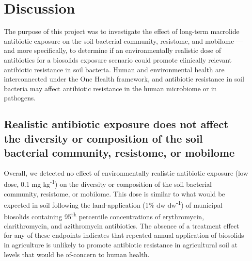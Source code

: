 \chapter{Discussion}

The purpose of this project was to investigate the effect of long-term macrolide antibiotic exposure on the soil bacterial community, resistome, and mobilome --- and more specifically, to determine if an environmentally realistic dose of antibiotics for a biosolids exposure scenario could promote clinically relevant antibiotic resistance in soil bacteria.
Human and environmental health are interconnected under the One Health framework, and antibiotic resistance in soil bacteria may affect antibiotic resistance in the human microbiome or in pathogens.


\section{Realistic antibiotic exposure does not affect the diversity or composition of the soil bacterial community, resistome, or mobilome}


Overall, we detected no effect of environmentally realistic antibiotic exposure (low dose, 0.1 mg kg\textsuperscript{-1}) on the diversity or composition of the soil bacterial community, resistome, or mobilome.
This dose is similar to what would be expected in soil following the land-application (1\% dw dw\textsuperscript{-1}) of municipal biosolids containing 95\textsuperscript{th} percentile concentrations of erythromycin, clarithromycin, and azithromycin antibiotics.
The absence of a treatment effect for any of these endpoints indicates that repeated annual application of biosolids in agriculture is unlikely to promote antibiotic resistance in agricultural soil at levels that would be of-concern to human health.


